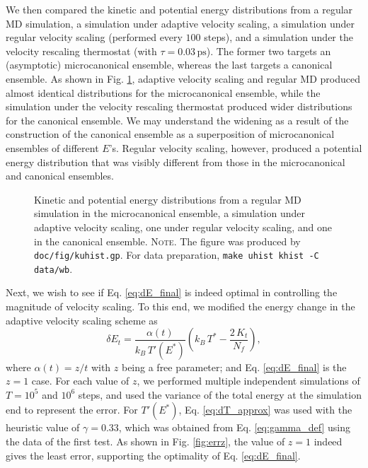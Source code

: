 \documentclass[reprint]{revtex4-1}
\newcommand{\note}[1]{{\color{DarkGreen}\footnotesize \textsc{Note.} #1}}
\begin{document}
We then compared the kinetic and potential energy
distributions from a regular MD simulation,
a simulation under adaptive velocity scaling,
a simulation under regular velocity scaling (performed every $100$ steps),
and
a simulation under the velocity rescaling
thermostat\cite{bussi2007}
(with $\tau = 0.03 \, \mathrm{ps}$).
%
The former two targets an (asymptotic) microcanonical ensemble,
whereas the last targets a canonical ensemble.
%
As shown in Fig. \ref{fig:kuhist},
adaptive velocity scaling and regular MD
produced almost identical distributions for the microcanonical ensemble,
while the simulation under the velocity rescaling thermostat
produced wider distributions for the canonical ensemble.
%
We may understand the widening %
as a result of the construction of the canonical ensemble
as a superposition of microcanonical ensembles of different $E$'s.
%
Regular velocity scaling, however, produced
a potential energy distribution that
was visibly different from
those in the microcanonical and canonical ensembles.
%

\begin{figure}[h]
\begin{center}
  \caption{
    \label{fig:kuhist}
    Kinetic and potential energy distributions
    from a regular MD simulation in the microcanonical ensemble,
    a simulation under adaptive velocity scaling,
    one under regular velocity scaling,
    and one in the canonical ensemble.
    \note{The figure was produced by \texttt{doc/fig/kuhist.gp}.
      For data preparation, \texttt{make uhist khist -C data/wb}.
    }%
  }
\end{center}
\end{figure}


Next, we wish to see if Eq. \eqref{eq:dE_final}
is indeed optimal in controlling the magnitude of velocity scaling.
%
To this end, we modified the energy change in
the adaptive velocity scaling scheme as
%
\begin{equation}
  \delta E_t
  =
  \frac{ \alpha(t) } { k_B \, T'(E^*) }
  \left(
   k_B \, T^* -
   \frac{ 2 \, K_t } { N_f }
  \right)
  ,
  \label{eq:dE_mod}
\end{equation}
%
where $\alpha(t) = z/t$ with $z$ being a free parameter;
and Eq. \eqref{eq:dE_final} is the $z = 1$ case.
%
For each value of $z$,
we performed multiple independent simulations of
$T = 10^5$ and $10^6$ steps,
and used the variance of the total energy at the simulation end
to represent the error.
%
For $T'(E^*)$,
Eq. \eqref{eq:dT_approx} was used with the heuristic value of
$\gamma = 0.33$,
which was obtained from Eq. \eqref{eq:gamma_def}
using the data of the first test.
%
As shown in Fig. \ref{fig:errz},
the value of $z = 1$
indeed gives the least error,
supporting the optimality of Eq. \eqref{eq:dE_final}.
\end{document}
